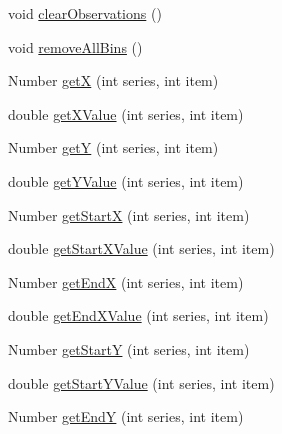 \begin{DoxyCompactItemize}
\item 
void \mbox{\hyperlink{classorg_1_1jfree_1_1data_1_1statistics_1_1_simple_histogram_dataset_a545a85ae7f765e14297f1070400231cc}{clear\+Observations}} ()
\item 
void \mbox{\hyperlink{classorg_1_1jfree_1_1data_1_1statistics_1_1_simple_histogram_dataset_a887a7d02aa9f339c8031c64a36f525bc}{remove\+All\+Bins}} ()
\item 
Number \mbox{\hyperlink{classorg_1_1jfree_1_1data_1_1statistics_1_1_simple_histogram_dataset_a2e2e54d5364b95e41b7643061b9d1b58}{getX}} (int series, int item)
\item 
double \mbox{\hyperlink{classorg_1_1jfree_1_1data_1_1statistics_1_1_simple_histogram_dataset_abe5b334c787c634308cfd38c39be0a22}{get\+X\+Value}} (int series, int item)
\item 
Number \mbox{\hyperlink{classorg_1_1jfree_1_1data_1_1statistics_1_1_simple_histogram_dataset_a320b9e6c74edb45fd1c878964a5466c1}{getY}} (int series, int item)
\item 
double \mbox{\hyperlink{classorg_1_1jfree_1_1data_1_1statistics_1_1_simple_histogram_dataset_ad84a0d6f8df0d044dfad47ddf28fc7a0}{get\+Y\+Value}} (int series, int item)
\item 
Number \mbox{\hyperlink{classorg_1_1jfree_1_1data_1_1statistics_1_1_simple_histogram_dataset_a9db41ff665f21bedc22f0e5514dd52d8}{get\+StartX}} (int series, int item)
\item 
double \mbox{\hyperlink{classorg_1_1jfree_1_1data_1_1statistics_1_1_simple_histogram_dataset_a46053237a9d5ab27ed36a7ed0b83e537}{get\+Start\+X\+Value}} (int series, int item)
\item 
Number \mbox{\hyperlink{classorg_1_1jfree_1_1data_1_1statistics_1_1_simple_histogram_dataset_ae3a25c80ccb7a3dcea94b57641734c52}{get\+EndX}} (int series, int item)
\item 
double \mbox{\hyperlink{classorg_1_1jfree_1_1data_1_1statistics_1_1_simple_histogram_dataset_acad8234cbd7d6fa06c8202e807c066a7}{get\+End\+X\+Value}} (int series, int item)
\item 
Number \mbox{\hyperlink{classorg_1_1jfree_1_1data_1_1statistics_1_1_simple_histogram_dataset_a3cea8376e1afeb2064fc3a36b72d8c4b}{get\+StartY}} (int series, int item)
\item 
double \mbox{\hyperlink{classorg_1_1jfree_1_1data_1_1statistics_1_1_simple_histogram_dataset_a90ea760c22d437e38065981fa87e0be3}{get\+Start\+Y\+Value}} (int series, int item)
\item 
Number \mbox{\hyperlink{classorg_1_1jfree_1_1data_1_1statistics_1_1_simple_histogram_dataset_ae046f2a1b89f4a3cf42ffd21e8b0ed0f}{get\+EndY}} (int series, int item)

\end{DoxyCompactItemize}
